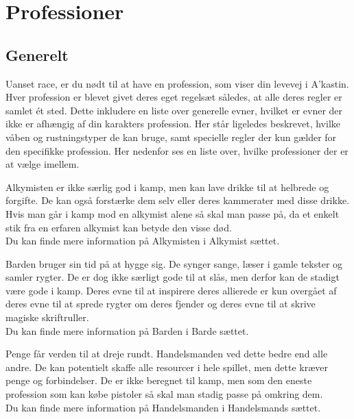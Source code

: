 \chapter*{Professioner}
\section*{Generelt}
Uanset race, er du nødt til at have en profession, som viser din levevej i A’kastin. Hver profession er blevet givet deres eget regelsæt således, at alle deres regler er samlet ét sted. Dette inkludere en liste over generelle evner, hvilket er evner der ikke er afhængig af din karakters profession. Her står ligeledes beskrevet, hvilke våben og rustningstyper de kan bruge, samt specielle regler der kun gælder for den specifikke profession. Her nedenfor ses en liste over, hvilke professioner der er at vælge imellem. \\

\begin{prof*}[Alkymist]
Alkymisten er ikke særlig god i kamp, men kan lave drikke til at helbrede og forgifte. De kan også forstærke dem selv eller deres kammerater med disse drikke. Hvis man går i kamp mod en alkymist alene så skal man passe på, da et enkelt stik fra en erfaren alkymist kan betyde den visse død.\\
Du kan finde mere information på Alkymisten i Alkymist sættet.
\end{prof*}

\begin{prof*}[Barde]
Barden bruger sin tid på at hygge sig. De synger sange, læser i gamle tekster og samler rygter. De er dog ikke særligt gode til at slås, men derfor kan de stadigt være gode i kamp. Deres evne til at inspirere deres allierede er kun overgået af deres evne til at sprede rygter om deres fjender og deres evne til at skrive magiske skriftruller.\\
Du kan finde mere information på Barden i Barde sættet.
\end{prof*}

\begin{prof*}[Handelsmanden]
Penge får verden til at dreje rundt. Handelsmanden ved dette bedre end alle andre. De kan potentielt skaffe alle resourcer i hele spillet, men dette kræver penge og forbindelser. De er ikke beregnet til kamp, men som den eneste profession som kan købe pistoler så skal man stadig passe på omkring dem.\\
Du kan finde mere information på Handelsmanden i Handelsmands sættet.
\end{prof*}

